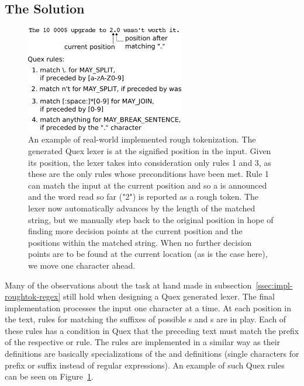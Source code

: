 \subsection{The Solution}
\label{ssec:impl-roughtok-solution}

\begin{figure}
  \includegraphics[width=0.618033988\textwidth]{img/quexexample.eps}
  \caption{An example of real-world implemented rough tokenization. The
  generated Quex lexer is at the signified position in the input. Given its
  position, the lexer takes into consideration only rules 1 and 3, as these are
  the only rules whose preconditions have been met. Rule 1 can match the
  input at the current position and so a \maysplit{} is announced and the
  word read so far ("2") is reported as a rough token. The lexer now
  automatically advances by the length of the matched string, but we manually
  step back to the original position in hope of finding more decision points
  at the current position and the positions within the matched string. When no
  further decision points are to be found at the current location (as is the
  case here), we move one character ahead.}
  \label{fig:quex-example}
\end{figure}

Many of the observations about the task at hand made in
subsection~\ref{ssec:impl-roughtok-regex} still hold when designing a Quex
generated lexer. The final implementation processes the input one character at
a time. At each position in the text, rules for matching the suffixes of
possible \maysplit{}s and \mayjoin{}s are in play. Each of these rules has a
condition in Quex that the preceding text must match the prefix of the
respective \maysplit{} or \mayjoin{} rule. The \maybreaksentence{} rules
are implemented in a similar way as their definitions are basically
specializations of the \maysplit{} and \mayjoin{} definitions (single
characters for prefix or suffix instead of regular expressions). An example of
such Quex rules can be seen on Figure~\ref{fig:quex-example}.

